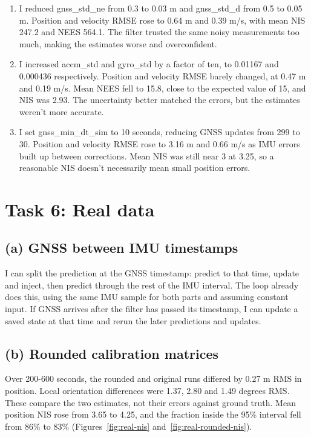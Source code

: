 \documentclass[10pt,a4paper]{article}
\begin{document}
\begin{enumerate}
\item I reduced gnss\_std\_ne from 0.3 to 0.03 m and gnss\_std\_d from 0.5 to 0.05 m.
Position and velocity RMSE rose to 0.64 m and 0.39 m/s, with mean NIS 247.2
and NEES 564.1. The filter trusted the same noisy measurements too much,
making the estimates worse and overconfident.

\item I increased accm\_std and gyro\_std by a factor of ten, to 0.01167 and
0.000436 respectively. Position and velocity RMSE barely changed, at 0.47 m
and 0.19 m/s. Mean NEES fell to 15.8, close to the expected value of 15, and
NIS was 2.93. The uncertainty better matched the errors, but the estimates
weren't more accurate.

\item I set gnss\_min\_dt\_sim to 10 seconds, reducing GNSS updates from 299 to 30.
Position and velocity RMSE rose to 3.16 m and 0.66 m/s as IMU errors built up
between corrections. Mean NIS was still near 3 at 3.25, so a reasonable NIS
doesn't necessarily mean small position errors.
\end{enumerate}
\section*{Task 6: Real data}
\subsection*{(a) GNSS between IMU timestamps}
I can split the prediction at the GNSS timestamp: predict to that time,
update and inject, then predict through the rest of the IMU interval. The loop
already does this, using the same IMU sample for both parts and assuming
constant input. If GNSS arrives after the filter has passed its timestamp,
I can update a saved state at that time and rerun the later predictions and
updates.

\subsection*{(b) Rounded calibration matrices}
Over 200-600 seconds, the rounded and original runs differed by 0.27 m RMS in
position. Local orientation differences were 1.37, 2.80 and 1.49 degrees RMS.
These compare the two estimates, not their errors against ground truth.
Mean position NIS rose from 3.65 to 4.25, and the fraction inside the 95\%
interval fell from 86\% to 83\% (Figures~\ref{fig:real-nis} and~\ref{fig:real-rounded-nis}).
\end{document}

